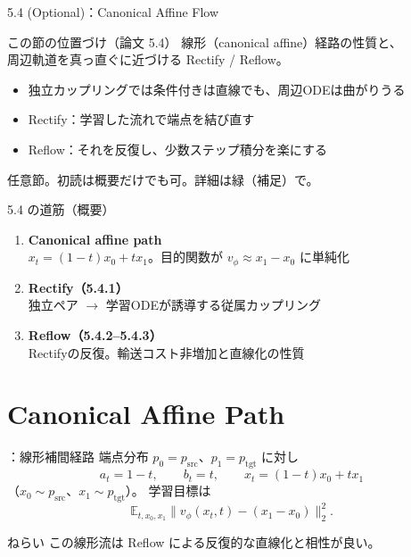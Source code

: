 

\begin{frame}{5.4 (Optional)：Canonical Affine Flow}
    \begin{block}{この節の位置づけ（論文 5.4）}
        線形（canonical affine）経路の性質と、\\
        周辺軌道を真っ直ぐに近づける Rectify / Reflow。
    \end{block}
    \begin{itemize}
        \item 独立カップリングでは条件付きは直線でも、周辺ODEは曲がりうる
        \item Rectify：学習した流れで端点を結び直す
        \item Reflow：それを反復し、少数ステップ積分を楽にする
    \end{itemize}
    \vfill
    \footnotesize
    任意節。初読は概要だけでも可。詳細は緑（補足）で。
\end{frame}
\asmain
\begin{frame}{5.4 の道筋（概要）}
    \begin{enumerate}
        \item \textbf{Canonical affine path}\\
        $x_t=(1-t)x_0+tx_1$。目的関数が $v_\phi\approx x_1-x_0$ に単純化
        \item \textbf{Rectify（5.4.1）}\\
        独立ペア $\to$ 学習ODEが誘導する従属カップリング
        \item \textbf{Reflow（5.4.2--5.4.3）}\\
        Rectifyの反復。輸送コスト非増加と直線化の性質
    \end{enumerate}
\end{frame}
\section{Canonical Affine Path}
\assuppl
\begin{frame}{\supplmark：線形補間経路}
    端点分布 $p_0=p_{\mathrm{src}}$、$p_1=p_{\mathrm{tgt}}$ に対し
    \[
        a_t=1-t,\qquad b_t=t,
        \qquad
        x_t=(1-t)x_0+tx_1
    \]
    （$x_0\sim p_{\mathrm{src}}$、$x_1\sim p_{\mathrm{tgt}}$）。
    学習目標は
    \[
        \mathbb{E}_{t,x_0,x_1}
        \bigl\|
            v_\phi(x_t,t)-(x_1-x_0)
        \bigr\|_2^{2}.
    \]
    \begin{exampleblock}{ねらい}
        この線形流は Reflow による反復的な直線化と相性が良い。
    \end{exampleblock}
\end{frame}
